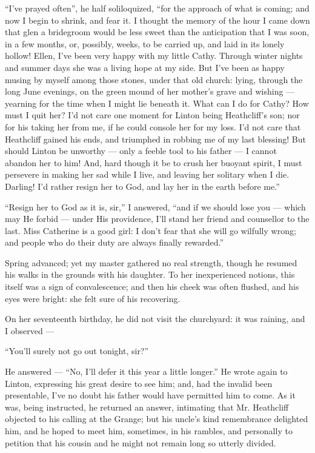 \par “I've prayed often”, he half soliloquized, “for the approach of what is coming; and now I begin to shrink, and fear it. I thought the memory of the hour I came down that glen a bridegroom would be less sweet than the anticipation that I was soon, in a few months, or, possibly, weeks, to be carried up, and laid in its lonely hollow! Ellen, I've been very happy with my little Cathy. Through winter nights and summer days she was a living hope at my side. But I've been as happy musing by myself among those stones, under that old church: lying, through the long June evenings, on the green mound of her mother's grave and wishing — yearning for the time when I might lie beneath it. What can I do for Cathy? How must I quit her? I'd not care one moment for Linton being Heathcliff's son; nor for his taking her from me, if he could console her for my loss. I'd not care that Heathcliff gained his ends, and triumphed in robbing me of my last blessing! But should Linton be unworthy — only a feeble tool to his father — I cannot abandon her to him! And, hard though it be to crush her buoyant spirit, I must persevere in making her sad while I live, and leaving her solitary when I die. Darling! I'd rather resign her to God, and lay her in the earth before me.”
\par “Resign her to God as it is, sir,” I answered, “and if we should lose you — which may He forbid — under His providence, I'll stand her friend and counsellor to the last. Miss Catherine is a good girl: I don't fear that she will go wilfully wrong; and people who do their duty are always finally rewarded.”
\par Spring advanced; yet my master gathered no real strength, though he resumed his walks in the grounds with his daughter. To her inexperienced notions, this itself was a sign of convalescence; and then his cheek was often flushed, and his eyes were bright: she felt sure of his recovering.
\par On her seventeenth birthday, he did not visit the churchyard: it was raining, and I observed —
\par “You'll surely not go out tonight, sir?”
\par He answered — “No, I'll defer it this year a little longer.” He wrote again to Linton, expressing his great desire to see him; and, had the invalid been presentable, I've no doubt his father would have permitted him to come. As it was, being instructed, he returned an answer, intimating that Mr. Heathcliff objected to his calling at the Grange; but his uncle's kind remembrance delighted him, and he hoped to meet him, sometimes, in his rambles, and personally to petition that his cousin and he might not remain long so utterly divided.
